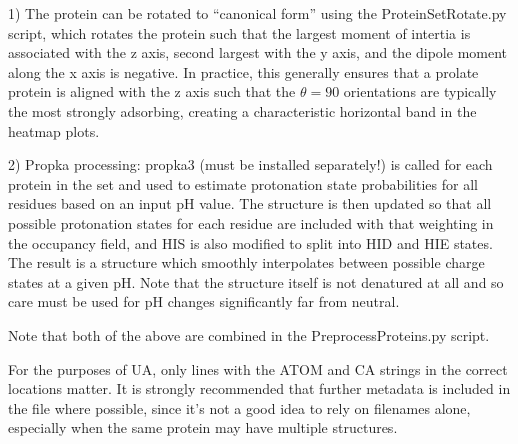 \documentclass[10pt,a4paper,onecolumn]{report}
\begin{document}
1) The protein can be rotated to ``canonical form'' using the ProteinSetRotate.py script, which rotates the protein such that the largest moment of intertia is associated with the z axis, second largest with the y axis, and the dipole moment along the x axis is negative. In practice, this generally ensures that a prolate protein is aligned with the z axis such that the $\theta = 90$ orientations are typically the most strongly adsorbing, creating a characteristic horizontal band in the heatmap plots. 

2) Propka processing: propka3 (must be installed separately!) is called for each protein in the set and used to estimate protonation state probabilities for all residues based on an input pH value. The structure is then updated so that all possible protonation states for each residue are included with that weighting in the occupancy field, and HIS is also modified to split into HID and HIE states. The result is a structure which smoothly interpolates between possible charge states at a given pH. Note that the structure itself is not denatured at all and so care must be used for pH changes significantly far from neutral. 

Note that both of the above are combined in the PreprocessProteins.py script.

For the purposes of UA, only lines with the ATOM and CA strings in the correct locations matter. It is strongly recommended that further metadata is included in the file where possible, since it's not a good idea to rely on filenames alone, especially when the same protein may have multiple structures.
 
\end{document}
